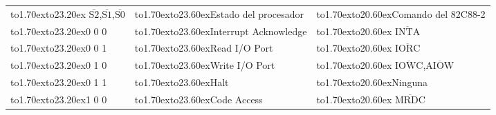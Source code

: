 \begin{table}[!hbt]\centering
\begin{tabular}{|l|l|l|}
\cline{1-3}
\vbox to1.70ex{\vspace{1pt}\vfil\hbox to23.20ex{\hfil %
$\overline{\mbox{S2}}$,$\overline{\mbox{S1}}$,$\overline{\mbox{S0}}$\hfil}} &  
\vbox to1.70ex{\vspace{1pt}\vfil\hbox to23.60ex{\hfil Estado del procesador\hfil}} & 
\vbox to1.70ex{\vspace{1pt}\vfil\hbox to20.60ex{\hfil Comando del 82C88-2\hfil}} \\

\cline{1-3}
\vbox to1.70ex{\vspace{1pt}\vfil\hbox to23.20ex{\hfil 0 0 0\hfil}} & 
\vbox to1.70ex{\vspace{1pt}\vfil\hbox to23.60ex{Interrupt Acknowledge\hfil}} & 
\vbox to1.70ex{\vspace{1pt}\vfil\hbox to20.60ex{\hfil %
$\overline{\mbox{INTA}}$\hfil}} \\

\cline{1-3}
\vbox to1.70ex{\vspace{1pt}\vfil\hbox to23.20ex{\hfil 0 0 1\hfil}} & 
\vbox to1.70ex{\vspace{1pt}\vfil\hbox to23.60ex{Read I/O Port\hfil}} & 
\vbox to1.70ex{\vspace{1pt}\vfil\hbox to20.60ex{\hfil %
$\overline{\mbox{IORC}}$\hfil}} \\

\cline{1-3}
\vbox to1.70ex{\vspace{1pt}\vfil\hbox to23.20ex{\hfil 0 1 0\hfil}} & 
\vbox to1.70ex{\vspace{1pt}\vfil\hbox to23.60ex{Write I/O Port\hfil}} & 
\vbox to1.70ex{\vspace{1pt}\vfil\hbox to20.60ex{\hfil %
$\overline{\mbox{IOWC}}$,$\overline{\mbox{AIOW}}$\hfil}} \\ 

\cline{1-3}
\vbox to1.70ex{\vspace{1pt}\vfil\hbox to23.20ex{\hfil 0 1 1\hfil}} & 
\vbox to1.70ex{\vspace{1pt}\vfil\hbox to23.60ex{Halt\hfil}} & 
\vbox to1.70ex{\vspace{1pt}\vfil\hbox to20.60ex{\hfil Ninguna\hfil}} \\

\cline{1-3}
\vbox to1.70ex{\vspace{1pt}\vfil\hbox to23.20ex{\hfil 1 0 0\hfil}} & 
\vbox to1.70ex{\vspace{1pt}\vfil\hbox to23.60ex{Code Access\hfil}} & 
\vbox to1.70ex{\vspace{1pt}\vfil\hbox to20.60ex{\hfil %
$\overline{\mbox{MRDC}}$\hfil}} \\


\end{tabular}
\end{table}

